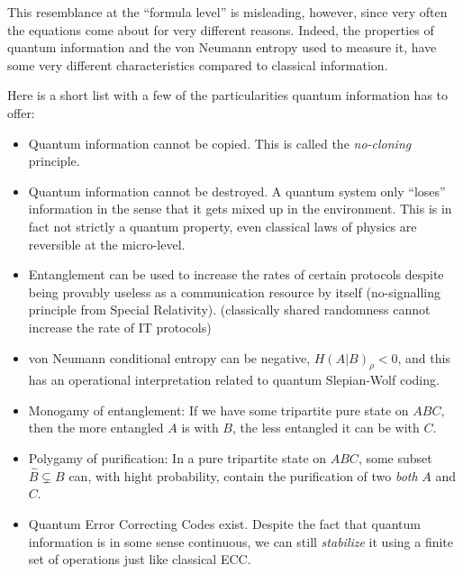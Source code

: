 \documentclass[aps,11pt,twoside,letterpaper]{article}
\begin{document}
	This resemblance at the ``formula level'' is misleading, however, since very often the equations
	come about for very different reasons.
	Indeed, the properties of quantum information and the von Neumann entropy used
	to measure it, have some very different characteristics compared to classical information.
	
	Here is a short list with a few of the particularities quantum information has to offer:
	
	\begin{itemize}
		\item 	Quantum information cannot be copied. This is called the \emph{no-cloning} principle.
		\item 	Quantum information cannot be destroyed. A quantum system only ``loses'' 
				information in the sense that it gets mixed up in the environment. 
				This is in fact not strictly a quantum property, even classical laws of physics are 
				reversible at the micro-level.
		\item 	Entanglement can be used to increase the rates of certain protocols despite being
				provably useless as a communication resource by itself (no-signalling principle from Special Relativity).
				(classically shared randomness cannot increase the rate of IT protocols)
		\item 	von Neumann conditional entropy can be negative,
				$H(A|B)_\rho < 0$, and this has an operational interpretation related to quantum Slepian-Wolf coding.
		\item 	Monogamy of entanglement:  If we have some tripartite pure state on $ABC$,
				then the more entangled $A$ is with $B$, the less entangled it can be with $C$.
		\item		Polygamy of purification: In a pure tripartite state on $ABC$, some subset $\hat{B} \subsetneq B $ can,
				with hight probability, contain the purification of two \emph{both} $A$ and $C$.
		\item		Quantum Error Correcting Codes exist.
				Despite the fact that quantum information is in some sense continuous,
				we can still \emph{stabilize} it using a finite set of operations just like classical ECC.
	\end{itemize}	
\end{document}
